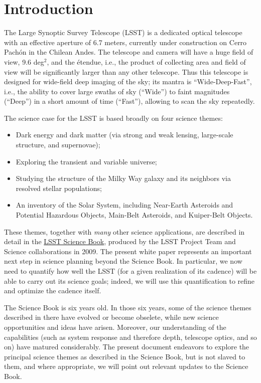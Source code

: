 
\chapter[Introduction]{Introduction}
\def\chpname{intro}\label{chp:\chpname}


The Large Synoptic Survey Telescope (LSST) is a dedicated optical
telescope with an effective aperture of 6.7 meters, currently under
construction on Cerro Pach\'on in the Chilean Andes.  The telescope
and camera will have a huge field of view, 9.6 deg$^2$, and the
\'etendue, i.e., the product of collecting area and field of view will
be significantly larger than any other telescope.  Thus this telescope
is designed for wide-field deep imaging of the sky; its mantra is
``Wide-Deep-Fast'', i.e., the ability to cover large swaths of sky
(``Wide'') to faint magnitudes (``Deep'') in a short amount of time
(``Fast''), allowing to scan the sky repeatedly. 

  The science case for the LSST is based broadly on four science
  themes: 
\begin{itemize} 
\item Dark energy and dark matter (via strong and weak lensing,
  large-scale structure, and supernovae);
\item Exploring the transient and variable universe; 
\item Studying the structure of the Milky Way galaxy and its neighbors
  via resolved stellar populations;
\item An inventory of the Solar System, including Near-Earth Asteroids
  and Potential Hazardous Objects, Main-Belt Asteroids, and
  Kuiper-Belt Objects.
\end{itemize}

These themes, together with {\em many} other science applications, are
described in detail in the
\href{http://lsst.org/scientists/scibook}{LSST Science Book}, produced
by the LSST Project Team and Science collaborations in 2009.  The
present white paper represents an important next step in science
planning beyond the Science Book.  In particular, we now need to
quantify how well the LSST (for a given realization of its cadence)
will be able to carry out its science goals; indeed, we will use this
quantification to refine and optimize the cadence itself. 

The Science Book is six years old.  In those six years, some of the
science themes described in there have evolved or become obselete,
while new science opportunities and ideas have arisen.  Moreover, our
understanding of the capabilities (such as system response and
therefore depth, telescope optics, and so on) have matured
considerably.  The present document endeavors to explore the
principal science themes as described in the Science Book, but is not
slaved to them, and where appropriate, we will point out relevant 
updates to the Science Book.  


